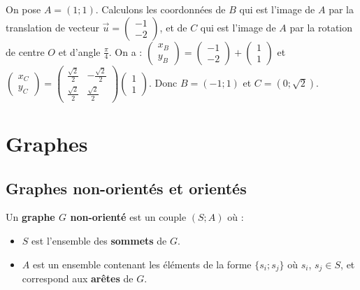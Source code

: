 	\begin{tip}[Exemple]
		On pose $A = (1; 1)$. Calculons les coordonnées de $B$ qui est l'image de $A$ par la translation de vecteur $\displaystyle{\overrightarrow{u} = \begin{pmatrix} -1 \\ -2 \end{pmatrix}}$, et de $C$ qui est l'image de $A$ par la rotation de centre $O$ et d'angle $\displaystyle{\frac{\pi}{4}}$.
		\newpar
		On a :
		\newpar
		$\displaystyle{\begin{pmatrix} x_B \\ y_B \end{pmatrix} = \begin{pmatrix} -1 \\ -2 \end{pmatrix} + \begin{pmatrix} 1 \\ 1 \end{pmatrix}}$ et $\displaystyle{\begin{pmatrix} x_C \\ y_C \end{pmatrix} = \begin{pmatrix} \frac{\sqrt{2}}{2} & -\frac{\sqrt{2}}{2} \\ \frac{\sqrt{2}}{2} & \frac{\sqrt{2}}{2} \end{pmatrix} \begin{pmatrix} 1 \\ 1 \end{pmatrix}}$.
		\newpar
		Donc $B = (-1; 1)$ et $C = (0; \sqrt{2})$.
	\end{tip}
	
	\section{Graphes}
	
	\subsection{Graphes non-orientés et orientés}
	
	\begin{formula}
		Un \textbf{graphe $G$ non-orienté} est un couple $(S; A)$ où :
		\begin{itemize}
			\item $S$ est l'ensemble des \textbf{sommets} de $G$.
			\item $A$ est un ensemble contenant les éléments de la forme $\{s_i; s_j\}$ où $s_i$, $s_j \in S$, et correspond aux \textbf{arêtes} de $G$.
		\end{itemize}
	\end{formula}
	
